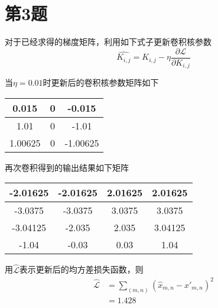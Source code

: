\documentclass[12pt,AutoFakeBold]{article}
\begin{document}
    \section*{第3题}
    对于已经求得的梯度矩阵，利用如下式子更新卷积核参数
    \[\hat{K_{i,j}} = K_{i,j} - \eta\frac{\partial \mathcal{L}}{\partial K_{i,j}}\]

    当\(\eta = 0.01\)时更新后的卷积核参数矩阵如下
    \begin{center}
        \begin{tabular}{|c|c|c|}
            \hline
            0.015&0&-0.015\\
            \hline
            1.01&0&-1.01\\
            \hline
            1.00625&0&-1.00625\\
            \hline
        \end{tabular}
    \end{center}

    再次卷积得到的输出结果如下矩阵
    \begin{center}
        \begin{tabular}{|c|c|c|c|}
            \hline
            -2.01625&-2.01625&2.01625&2.01625\\
            \hline
            -3.0375&-3.0375&3.0375&3.0375\\
            \hline
            -3.04125&-2.035&2.035&3.04125\\
            \hline
            -1.04&-0.03&0.03&1.04\\
            \hline
        \end{tabular}
    \end{center}

    用\(\hat{\mathcal{L}}\)表示更新后的均方差损失函数，则
    \begin{equation}
        \begin{split}
            \hat{\mathcal{L}} &= \sum_{(m,n)} (\hat{x}_{m,n} - {x'}_{m,n})^2\\
            &= 1.428
        \end{split}
    \end{equation}
\end{document}
